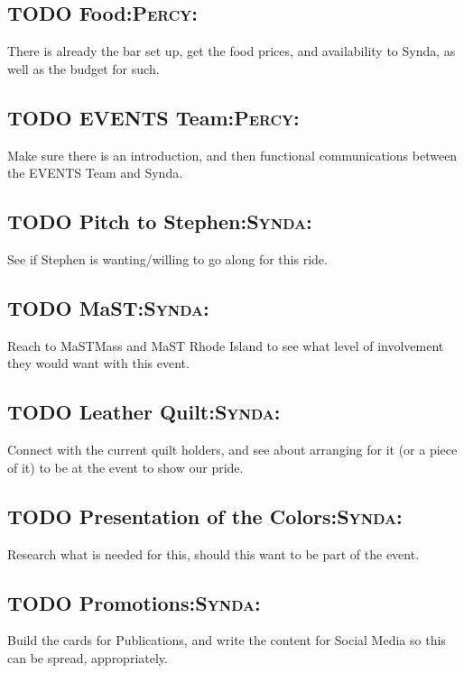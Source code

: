 \documentclass[captions=tablesignature]{scrartcl}
\begin{document}
\subsection{{\bfseries\sffamily TODO} Food\hfill{}\textsc{:Percy:}}
\label{sec-2-9}
There is already the bar set up, get the food prices, and
availability to Synda, as well as the budget for such.

\subsection{{\bfseries\sffamily TODO} EVENTS Team\hfill{}\textsc{:Percy:}}
\label{sec-2-10}
Make sure there is an introduction, and then functional
communications between the EVENTS Team and Synda.

\subsection{{\bfseries\sffamily TODO} Pitch to Stephen\hfill{}\textsc{:Synda:}}
\label{sec-2-11}
See if Stephen is wanting/willing to go along for this ride.

\subsection{{\bfseries\sffamily TODO} MaST\hfill{}\textsc{:Synda:}}
\label{sec-2-12}
Reach to MaSTMass and MaST Rhode Island to see what level of
involvement they would want with this event.

\subsection{{\bfseries\sffamily TODO} Leather Quilt\hfill{}\textsc{:Synda:}}
\label{sec-2-13}
Connect with the current quilt holders, and see about arranging for
it (or a piece of it) to be at the event to show our pride.

\subsection{{\bfseries\sffamily TODO} Presentation of the Colors\hfill{}\textsc{:Synda:}}
\label{sec-2-14}
Research what is needed for this, should this want to be part of
the event.

\subsection{{\bfseries\sffamily TODO} Promotions\hfill{}\textsc{:Synda:}}
\label{sec-2-15}
Build the cards for Publications, and write the content for Social
Media so this can be spread, appropriately.
\end{document}
